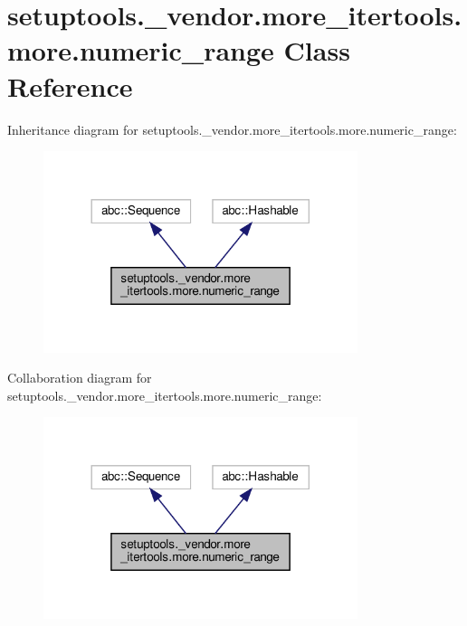 \hypertarget{classsetuptools_1_1__vendor_1_1more__itertools_1_1more_1_1numeric__range}{}\section{setuptools.\+\_\+vendor.\+more\+\_\+itertools.\+more.\+numeric\+\_\+range Class Reference}
\label{classsetuptools_1_1__vendor_1_1more__itertools_1_1more_1_1numeric__range}


Inheritance diagram for setuptools.\+\_\+vendor.\+more\+\_\+itertools.\+more.\+numeric\+\_\+range\+:
\nopagebreak
\begin{figure}[H]
\begin{center}
\leavevmode
\includegraphics[width=260pt]{classsetuptools_1_1__vendor_1_1more__itertools_1_1more_1_1numeric__range__inherit__graph}
\end{center}
\end{figure}


Collaboration diagram for setuptools.\+\_\+vendor.\+more\+\_\+itertools.\+more.\+numeric\+\_\+range\+:
\nopagebreak
\begin{figure}[H]
\begin{center}
\leavevmode
\includegraphics[width=260pt]{classsetuptools_1_1__vendor_1_1more__itertools_1_1more_1_1numeric__range__coll__graph}
\end{center}
\end{figure}

